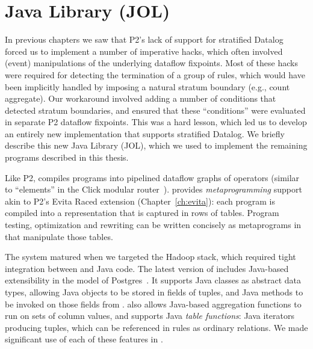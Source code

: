 \section{Java \OVERLOG Library (JOL)}
\label{ch:boom:sec:jol}

In previous chapters we saw that P2's lack of support for stratified Datalog
forced us to implement a number of imperative hacks, which often involved
(event) manipulations of the underlying dataflow fixpoints.  Most of these
hacks were required for detecting the termination of a group of rules, which
would have been implicitly handled by imposing a natural stratum boundary
(e.g., count aggregate).  Our workaround involved adding a number of conditions
that detected stratum boundaries, and ensured that these ``conditions'' were
evaluated in separate P2 dataflow fixpoints.  This was a hard lesson, which led
us to develop an entirely new \OVERLOG implementation that supports stratified
Datalog.  We briefly describe this new Java \OVERLOG Library (JOL), which we
used to implement the remaining \OVERLOG programs described in this thesis.

Like P2, \JOL compiles \OVERLOG programs into pipelined dataflow graphs of
operators (similar to ``elements'' in the Click modular router~\cite{click}).
\JOL provides {\em metaprogramming} support akin to P2's Evita Raced
extension (Chapter~\ref{ch:evita}): each \OVERLOG program is compiled into a
representation that is captured in rows of tables.  Program testing,
optimization and rewriting can be written concisely as metaprograms in \OVERLOG
that manipulate those tables.

The \JOL system matured when we targeted the Hadoop stack, which required tight
integration between \OVERLOG and Java code.  The latest version of \JOL
includes Java-based extensibility in the model of Postgres~\cite{postgres}.  It
supports Java classes as abstract data types, allowing Java objects to be
stored in fields of tuples, and Java methods to be invoked on those fields from
\OVERLOG.  \JOL also allows Java-based aggregation functions to run on sets of
column values, and supports Java {\em table functions}: Java iterators
producing tuples, which can be referenced in \OVERLOG rules as ordinary
relations.  We made significant use of each of these features in \BOOMA.


